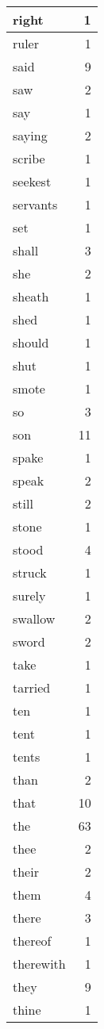 \begin{center}
\begin{longtable}{l|r}
right & 1 \\ \hline
ruler & 1 \\ \hline
said & 9 \\ \hline
saw & 2 \\ \hline
say & 1 \\ \hline
saying & 2 \\ \hline
scribe & 1 \\ \hline
seekest & 1 \\ \hline
servants & 1 \\ \hline
set & 1 \\ \hline
shall & 3 \\ \hline
she & 2 \\ \hline
sheath & 1 \\ \hline
shed & 1 \\ \hline
should & 1 \\ \hline
shut & 1 \\ \hline
smote & 1 \\ \hline
so & 3 \\ \hline
son & 11 \\ \hline
spake & 1 \\ \hline
speak & 2 \\ \hline
still & 2 \\ \hline
stone & 1 \\ \hline
stood & 4 \\ \hline
struck & 1 \\ \hline
surely & 1 \\ \hline
swallow & 2 \\ \hline
sword & 2 \\ \hline
take & 1 \\ \hline
tarried & 1 \\ \hline
ten & 1 \\ \hline
tent & 1 \\ \hline
tents & 1 \\ \hline
than & 2 \\ \hline
that & 10 \\ \hline
the & 63 \\ \hline
thee & 2 \\ \hline
their & 2 \\ \hline
them & 4 \\ \hline
there & 3 \\ \hline
thereof & 1 \\ \hline
therewith & 1 \\ \hline
they & 9 \\ \hline
thine & 1 \\ \hline

\end{longtable}
\end{center}
